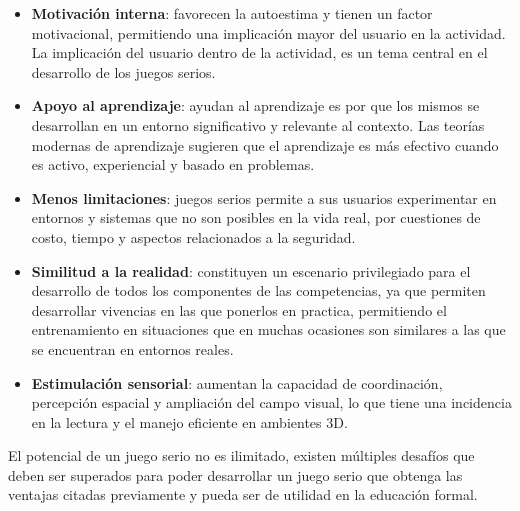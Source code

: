 \begin{itemize}

\item \textbf{Motivación interna}: favorecen la autoestima y tienen un factor
    motivacional\cite{guenaga2013serious}, permitiendo una implicación mayor del
    usuario en la actividad\cite{sg:aoverview}. La implicación del usuario
    dentro de la actividad, es un tema central en el desarrollo de los juegos
    serios\cite{charsky:2010}.

\item \textbf{Apoyo al aprendizaje}: ayudan al aprendizaje es por que los mismos
    se desarrollan en un entorno significativo y relevante al
    contexto\cite{sg:aoverview}. Las teorías modernas de aprendizaje sugieren
    que el aprendizaje es más efectivo cuando es activo, experiencial y basado
    en problemas\cite{guenaga2013serious}.

\item \textbf{Menos limitaciones}: juegos serios permite a sus usuarios
    experimentar en entornos y sistemas que no son posibles en la vida real, por
    cuestiones de costo, tiempo y aspectos relacionados a la
    seguridad\cite{sg:aoverview}.

\item \textbf{Similitud a la realidad}: constituyen un escenario privilegiado
    para el desarrollo de todos los componentes de las competencias, ya que
    permiten desarrollar vivencias en las que ponerlos en practica, permitiendo
    el entrenamiento en situaciones que en muchas ocasiones son similares a las
    que se encuentran en entornos reales\cite{guenaga2013serious,sg:aoverview}.
    
\item \textbf{Estimulación sensorial}: aumentan la capacidad de coordinación,
    percepción espacial y ampliación del campo visual, lo que tiene una
    incidencia en la lectura y el manejo eficiente en ambientes
    3D\cite{guenaga2013serious}. 

\end{itemize}

El potencial de un juego serio no es ilimitado, existen múltiples desafíos que
deben ser superados para poder desarrollar un juego serio que obtenga las ventajas
citadas previamente y pueda ser de utilidad en la educación formal.


